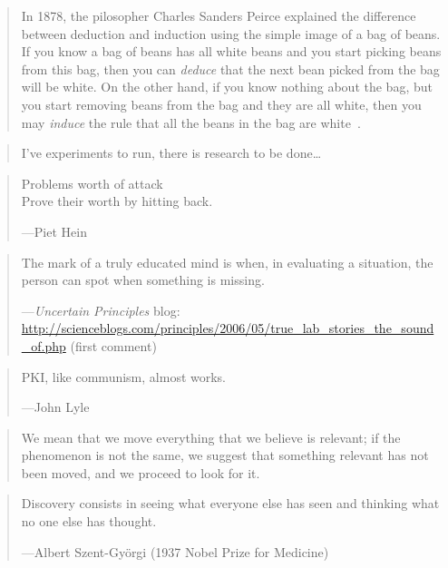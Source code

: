 \documentclass[a4paper]{article}
\begin{document}
\medskip
\begin{quote}
	In 1878, the pilosopher Charles Sanders Peirce explained the
	difference between deduction and induction using the simple
	image of a bag of beans.  If you know a bag of beans has all
	white beans and you start picking beans from this bag, then
	you can \emph{deduce} that the next bean picked from the bag
	will be white.  On the other hand, if you know nothing about
	the bag, but you start removing beans from the bag and they
	are all white, then you may \emph{induce} the rule that all
	the beans in the bag are white~\citep[p.~215]{Shasha1995}.
\end{quote}

\medskip
\begin{quote}
	I've experiments to run, there is research to be
	done\ldots~\citep{Coulton2007}
\end{quote}

\medskip
\begin{quote}
	Problems worth of attack\\
	Prove their worth by hitting back.

	---Piet Hein
\end{quote}

\medskip
\begin{quote}
	The mark of a truly educated mind is when, in evaluating a
	situation, the person can spot when something is missing.

	---\emph{Uncertain Principles} blog:
	\url{http://scienceblogs.com/principles/2006/05/true_lab_stories_the_sound_of.php}
	(first comment)
\end{quote}

\medskip
\begin{quote}
	PKI, like communism, almost works.

	---John Lyle
\end{quote}

\medskip
\begin{quote}
	We mean that we move everything that we believe is relevant;
	if the phenomenon is not the same, we suggest that something
	relevant has not been moved, and we proceed to look for
	it.~\citep[vol.~1, p.~11--1]{Feynman1977}
\end{quote}

\medskip
\begin{quote}
	Discovery consists in seeing what everyone else has seen and
	thinking what no one else has thought.

	---Albert Szent-Gy\"orgi (1937 Nobel Prize for Medicine)
\end{quote}
\end{document}
